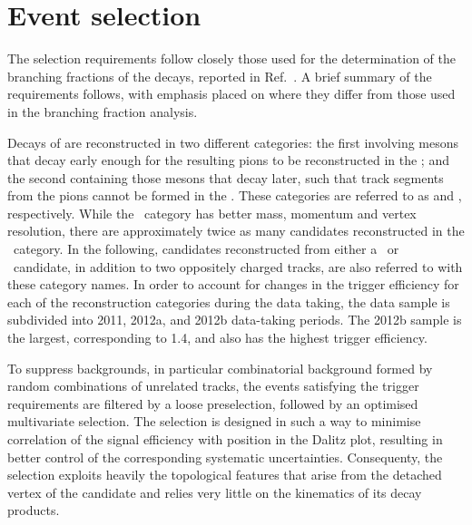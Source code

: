 \section{Event selection}
\label{sec:selection}

The selection requirements follow closely those used for the determination
of the branching fractions of the \BdstoKshhp decays, reported in
Ref.~\cite{LHCb-PAPER-2017-010}.
A brief summary of the requirements follows, with emphasis placed on
where they differ from those used in the branching fraction analysis.

Decays of \decay{\KS}{\pip\pim} are reconstructed in two different categories:
the first involving \KS mesons that decay early enough for the
resulting pions to be reconstructed in the \velo; and the
second containing those \KS mesons that decay later, such that track
segments from the pions cannot be formed in the \velo.
These categories are referred to as \emph{\LL} and \emph{\DD}, respectively.
While the \LL\ category has better mass, momentum and vertex resolution,
there are approximately twice as many \KS candidates reconstructed in the
\DD\ category.
In the following, \B candidates reconstructed from either a \LL\ or \DD\
\KS candidate, in addition to two oppositely charged tracks, are also
referred to with these category names.
In order to account for changes in the trigger efficiency for each of the
\KS reconstruction categories during the data taking, the data sample is
subdivided into 2011, 2012a, and 2012b data-taking periods.
The 2012b sample is the largest, corresponding to 1.4\invfb, and also has
the highest trigger efficiency.

To suppress backgrounds, in particular combinatorial background formed by
random combinations of unrelated tracks, the events satisfying the trigger
requirements are filtered by a loose preselection, followed by an optimised
multivariate selection.
The selection is designed in such a way to minimise correlation of the
signal efficiency with position in the Dalitz plot, resulting in better
control of the corresponding systematic uncertainties.
Consequenty, the selection exploits heavily the topological features
that arise from the detached vertex of the \B candidate and relies very
little on the kinematics of its decay products.

